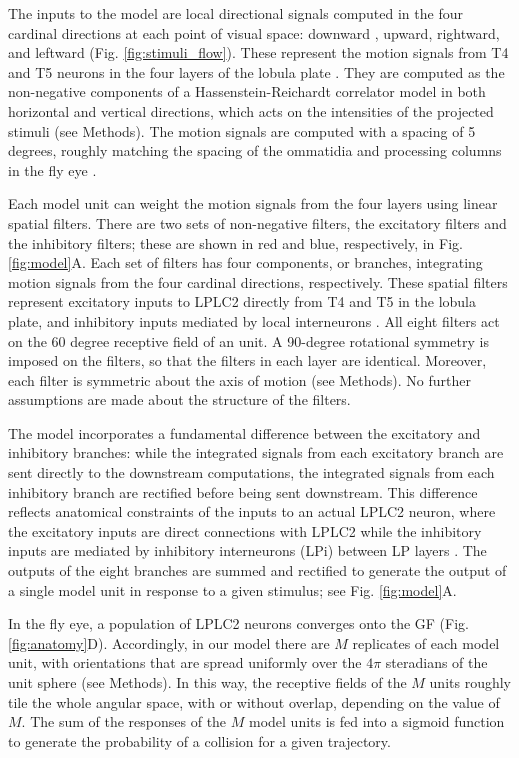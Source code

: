\documentclass[pdftex,9pt,lineno]{elife}
\begin{document}
The inputs to the model are local directional signals computed in the four cardinal directions at each point of visual space: downward , upward, rightward, and leftward (Fig. \ref{fig:stimuli_flow}). These represent the motion signals from T4 and T5 neurons in the four layers of the lobula plate \citep{maisak2013directional}. They are computed as the non-negative components of a Hassenstein-Reichardt correlator model \citep{hassenstein1956systemtheoretische} in both horizontal and vertical directions, which acts on the intensities of the projected stimuli (see Methods). The motion signals are computed with a spacing of 5 degrees, roughly matching the spacing of the ommatidia and processing columns in the fly eye \citep{stavenga2003angular}.

Each model unit can weight the motion signals from the four layers using linear spatial filters. There are two sets of non-negative filters, the excitatory filters and the inhibitory filters; these are shown in red and blue, respectively, in Fig. \ref{fig:model}A. Each set of filters has four components, or branches, integrating motion signals from the four cardinal directions, respectively. These spatial filters represent excitatory inputs to LPLC2 directly from T4 and T5 in the lobula plate, and inhibitory inputs  mediated by local interneurons \citep{klapoetke2017ultra,mauss2015neural}. All eight filters act on the 60 degree receptive field of an unit. A 90-degree rotational symmetry is imposed on the filters, so that the filters in each layer are identical. Moreover, each filter is symmetric about the axis of motion (see Methods). No further assumptions are made about the structure of the filters.

The model incorporates a fundamental difference between the excitatory and inhibitory branches: while the integrated signals from each excitatory branch are sent directly to the downstream computations, the integrated signals from each inhibitory branch are rectified before being sent downstream. This difference reflects anatomical constraints of the inputs to an actual LPLC2 neuron, where the excitatory inputs are direct connections with LPLC2 while the inhibitory inputs are mediated by inhibitory interneurons (LPi) between LP layers \citep{mauss2015neural,klapoetke2017ultra}. The outputs of the eight branches are summed and rectified to generate the output of a single model unit in response to a given stimulus; see Fig. \ref{fig:model}A.

In the fly eye, a population of LPLC2 neurons converges onto the GF (Fig. \ref{fig:anatomy}D). Accordingly, in our model there are $M$ replicates of each model unit, with orientations that are spread uniformly over the $4\pi$ steradians of the unit sphere (see Methods). In this way, the receptive fields of the $M$ units roughly  tile the whole angular space, with or without overlap, depending on the value of $M$. The sum of the responses of the $M$ model units is fed into a sigmoid function to generate the probability of a collision for a given trajectory.
\end{document}
